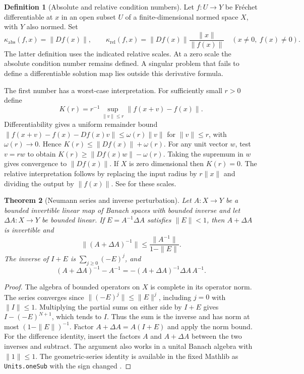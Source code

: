 \documentclass[11pt,oneside,openany]{book}
\theoremstyle{plain}
\newtheorem{theorem}{Theorem}[chapter]
\theoremstyle{definition}
\newtheorem{definition}[theorem]{Definition}
\theoremstyle{remark}
\begin{document}
\begin{definition}[Absolute and relative condition numbers]\label{p206:W09}
Let \(f:U\to Y\) be Fr\'echet differentiable at \(x\) in an open
subset \(U\) of a finite-dimensional normed space \(X\), with \(Y\)
also normed. Set
\[
 \kappa_{\mathrm{abs}}(f,x)=\|Df(x)\|,\qquad
 \kappa_{\mathrm{rel}}(f,x)
   =\|Df(x)\|\frac{\|x\|}{\|f(x)\|}\quad (x\ne0,\ f(x)\ne0).
\]
The latter definition uses the indicated relative scales.
At a zero scale the absolute condition number remains defined.
A singular problem that fails to define a differentiable solution
map lies outside this derivative formula.
\end{definition}
The first number has a worst-case interpretation. For sufficiently
small \(r>0\) define
\[
 K(r)=r^{-1}\sup_{\|v\|\le r}\|f(x+v)-f(x)\|.
\]
Differentiability gives a uniform remainder bound
\(\|f(x+v)-f(x)-Df(x)v\|\le\omega(r)\|v\|\) for
\(\|v\|\le r\), with \(\omega(r)\to0\).
Hence \(K(r)\le\|Df(x)\|+\omega(r)\). For any unit vector \(w\),
test \(v=rw\) to obtain \(K(r)\ge\|Df(x)w\|-\omega(r)\).
Taking the supremum in \(w\) gives convergence to
\(\|Df(x)\|\). If \(X\) is zero dimensional then \(K(r)=0\).
The relative interpretation follows by replacing the input radius
by \(r\|x\|\) and dividing the output by \(\|f(x)\|\).
See \cite[Sections 1.5--1.6]{higham} for these scales.

\begin{theorem}[Neumann series and inverse perturbation]\label{p206:W10}
Let \(A:X\to Y\) be a bounded invertible linear map of Banach
spaces with bounded inverse and let \(\Delta A:X\to Y\) be
bounded linear. If \(E=A^{-1}\Delta A\) satisfies
\(\|E\|<1\), then \(A+\Delta A\) is invertible and
\[
 \|(A+\Delta A)^{-1}\|\le \frac{\|A^{-1}\|}{1-\|E\|}.
\]
The inverse of \(I+E\) is \(\sum_{j\ge0}(-E)^j\), and
\[
 (A+\Delta A)^{-1}-A^{-1}
       =-(A+\Delta A)^{-1}\Delta A\,A^{-1}.
\]
\end{theorem}
\begin{proof}
The algebra of bounded operators on \(X\) is complete in its
operator norm. The series converges since
\(\|(-E)^j\|\le\|E\|^j\), including \(j=0\) with
\(\|I\|\le1\). Multiplying the partial sums on either side
by \(I+E\) gives \(I-(-E)^{N+1}\), which tends to \(I\).
Thus the sum is the inverse and has norm at most
\((1-\|E\|)^{-1}\). Factor \(A+\Delta A=A(I+E)\)
and apply the norm bound. For the difference identity, insert
the factors \(A\) and \(A+\Delta A\) between the two inverses and
subtract. The argument also works in a unital Banach algebra with
\(\|1\|\le1\). The geometric-series identity is available in
the fixed Mathlib as \texttt{Units.oneSub} with the sign changed
\cite{mathlib}.
\end{proof}
\end{document}
